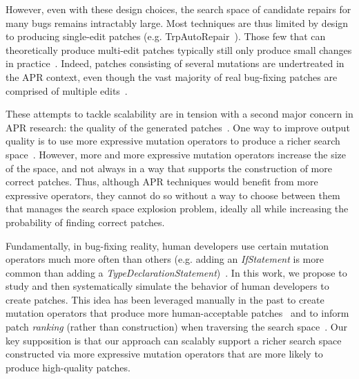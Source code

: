 \documentclass[conference]{IEEEtran}
\begin{document}
However, even with these design choices, the search space of candidate
repairs for many bugs remains intractably large.  Most techniques are thus
limited by design to producing single-edit patches (e.g. TrpAutoRepair~\cite{Qi13TrpAutoR}). 
Those few that can theoretically produce multi-edit patches
typically still only produce small changes in
practice~\cite{Qi15,arcuri11,angelix}. 
Indeed, patches
consisting of several mutations are undertreated in the APR context, even though the vast majority
of real bug-fixing patches are comprised of multiple edits~\cite{Soto16,zhong15}.

These attempts to tackle scalability are in tension with a second major concern
in APR research: the quality of the generated patches~\cite{Qi15}.  One way to
improve output quality is to use more expressive mutation operators to produce a
richer search space~\cite{long16}.  However, more and more expressive mutation
operators increase the size of the 
space, and not always in a way that supports the construction of more correct
patches.  Thus, although APR techniques would benefit from more expressive
operators, they cannot do so without a way to choose between them that manages
the search space explosion problem, ideally all while increasing the probability
of finding correct patches.

Fundamentally, in bug-fixing reality, human developers use
certain mutation operators much more often than others (e.g. adding an \emph{IfStatement} is more common than adding a \emph{TypeDeclarationStatement})~\cite{Soto16}. In this
work, we propose to study
and then systematically simulate the behavior of human developers to create
patches. This idea has been leveraged manually in the past to create
mutation operators that produce more human-acceptable patches~\cite{kim2013} and
to inform patch \emph{ranking} (rather than
construction) when traversing the search space~\cite{xuan16,long16proph}. 
Our key supposition is that our approach can scalably support a richer
search space constructed via more expressive mutation operators that are more
likely to produce high-quality patches.  
\end{document}
